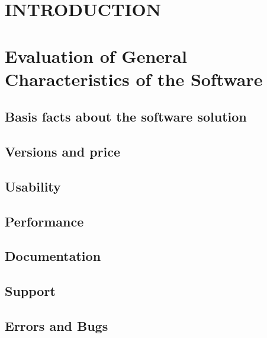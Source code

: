 
\renewcommand{\baselinestretch}{1.2}\normalsize

\chapter{INTRODUCTION}
\label{sec:introduction}

\setcounter{footnote}{1}


\chapter{Evaluation of General Characteristics of the Software}


\section{Basis facts about the software solution}


\section{Versions and price}


\section{Usability}


\section{Performance}


\section{Documentation}


\section{Support}


\section{Errors and Bugs}



